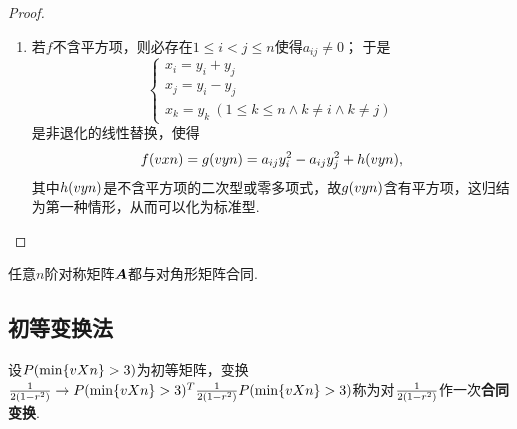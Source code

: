 \begin{theorem}
\begin{proof}
\begin{enumerate}
\item 若\(f\)不含平方项，则必存在\(1 \leqslant i < j \leqslant n\)使得\(a_{ij}\neq0\)；
于是\[
\left\{ \begin{array}{l}
x_i = y_i + y_j \\
x_j = y_i - y_j \\
x_k = y_k\ (1 \leqslant k \leqslant n \land k \neq i \land k \neq j)
\end{array} \right.
\]是非退化的线性替换，使得\[
f(\v{x}{n})
= g(\v{y}{n})
= a_{ij} y_i^2 - a_{ij} y_j^2 + h(\v{y}{n}),
\]其中\(h(\v{y}{n})\)是不含平方项的二次型或零多项式，故\(g(\v{y}{n})\)含有平方项，这归结为第一种情形，从而可以化为标准型.
\qedhere
\end{enumerate}
\end{proof}
\end{theorem}

\begin{corollary}
任意\(n\)阶对称矩阵\(\A\)都与对角形矩阵合同.
\end{corollary}

\subsection{初等变换法}
\begin{definition}
设\(\P\)为初等矩阵，变换\(\B \to \P^T\B\P\)称为对\(\B\)作一次\textbf{合同变换}.
\end{definition}

